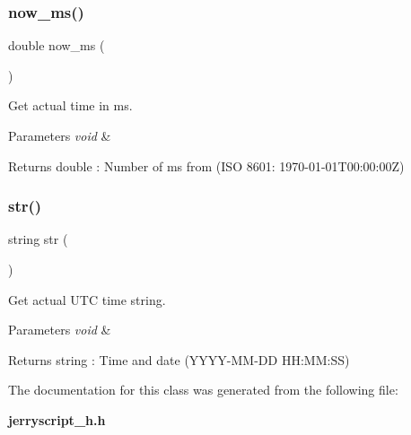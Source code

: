 \subsubsection{now\_ms()}
{\footnotesize\ttfamily double now\+\_\+ms (\begin{DoxyParamCaption}\item[{void}]{ }\end{DoxyParamCaption})}



Get actual time in ms. 


\begin{DoxyCode}{0}
\end{DoxyCode}



\begin{DoxyParams}{Parameters}
{\em void} & \\
\hline
\end{DoxyParams}
\begin{DoxyReturn}{Returns}
double \+: Number of ms from (I\+SO 8601\+: 1970-\/01-\/01T00\+:00\+:00Z) 
\end{DoxyReturn}
\mbox{\label{classtime_ae06c4c6e38e7ac957418e120c3e63f60}} 
\subsubsection{str()}
{\footnotesize\ttfamily string str (\begin{DoxyParamCaption}\item[{void}]{ }\end{DoxyParamCaption})}



Get actual U\+TC time string. 


\begin{DoxyCode}{0}
\end{DoxyCode}



\begin{DoxyParams}{Parameters}
{\em void} & \\
\hline
\end{DoxyParams}
\begin{DoxyReturn}{Returns}
string \+: Time and date (Y\+Y\+Y\+Y-\/\+M\+M-\/\+DD H\+H\+:\+MM\+:SS) 
\end{DoxyReturn}


The documentation for this class was generated from the following file\+:\begin{DoxyCompactItemize}
\item 
\textbf{ jerryscript\+\_\+h.\+h}\end{DoxyCompactItemize}
